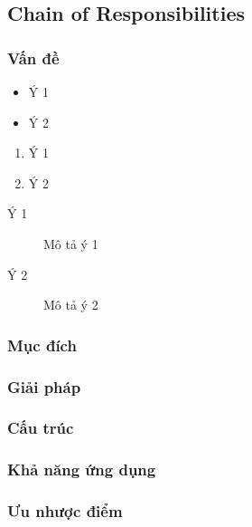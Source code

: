 \thispagestyle{empty}
\subsection{Chain of Responsibilities}
\subsubsection{Vấn đề}
\begin{flushleft}
	\begin{itemize}
		\item Ý 1
		\item Ý 2
	\end{itemize}

	\begin{enumerate}
		\item Ý 1
		\item Ý 2
	\end{enumerate}

	\begin{description}
		\item[Ý 1] Mô tả ý 1
		\item[Ý 2] Mô tả ý 2
	\end{description}
\end{flushleft}

\subsubsection{Mục đích}
\begin{flushleft}

\end{flushleft}

\subsubsection{Giải pháp}
\begin{flushleft}

\end{flushleft}

\subsubsection{Cấu trúc}
\begin{flushleft}

\end{flushleft}

\subsubsection{Khả năng ứng dụng}
\begin{flushleft}

\end{flushleft}

\subsubsection{Ưu nhược điểm}
\begin{flushleft}

\end{flushleft}